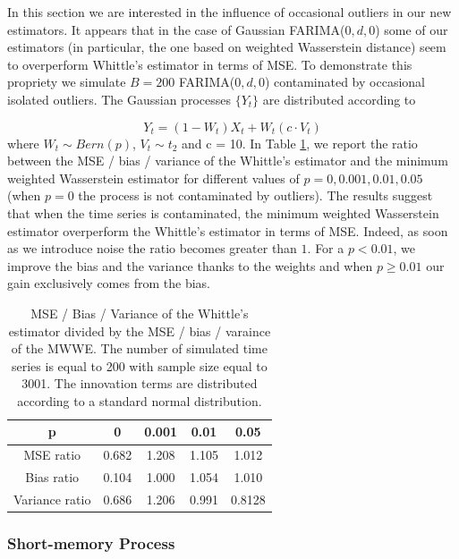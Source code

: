 \documentclass[
  11pt,
]{article}
\begin{document}
In this section we are interested in the influence of occasional
outliers in our new estimators. It appears that in the case of Gaussian
FARIMA(\(0, d, 0\)) some of our estimators (in particular, the one based
on weighted Wasserstein distance) seem to overperform Whittle's
estimator in terms of MSE. To demonstrate this propriety we simulate
\(B = 200\) FARIMA(\(0,d,0\)) contaminated by occasional isolated
outliers. The Gaussian processes \(\{Y_t\}\) are distributed according
to

\[Y_{t}=\left(1-W_{t}\right) X_{t}+W_{t}\left(c \cdot V_{t}\right)\]
where \(W_t \sim Bern(p)\), \(V_t \sim t_2\) and c = 10. In Table
\ref{tab:outliers}, we report the ratio between the MSE / bias /
variance of the Whittle's estimator and the minimum weighted Wasserstein
estimator for different values of \(p = 0, 0.001, 0.01, 0.05\) (when
\(p = 0\) the process is not contaminated by outliers). The results
suggest that when the time series is contaminated, the minimum weighted
Wasserstein estimator overperform the Whittle's estimator in terms of
MSE. Indeed, as soon as we introduce noise the ratio becomes greater
than \(1\). For a \(p < 0.01\), we improve the bias and the variance
thanks to the weights and when \(p \geq 0.01\) our gain exclusively
comes from the bias.

\begin{table}[h]
\centering
\begin{tabular}{|c|c|c|c|c|}
\hline
p  &  0  & 0.001   & 0.01    & 0.05 \\
\hline
MSE ratio  & 0.682 & 1.208 & 1.105 & 1.012 \\
\hline
Bias ratio & 0.104 & 1.000 & 1.054 & 1.010\\
\hline 
Variance ratio & 0.686 & 1.206 & 0.991 & 0.8128 \\ 
\hline
\end{tabular}
\caption{MSE / Bias / Variance of the Whittle's estimator divided by the MSE / bias / varaince of the MWWE. The number of simulated time series is equal to 200 with sample size equal to 3001. The innovation terms are distributed according to a standard normal distribution.}
\label{tab:outliers}
\end{table}

\hypertarget{short-memory-process}{%
\subsubsection{Short-memory Process}\label{short-memory-process}}
\end{document}
